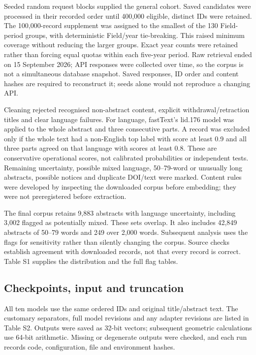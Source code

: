 \documentclass[12pt]{article}
\begin{document}
Seeded random request blocks supplied the general cohort. Saved candidates were processed in their recorded order until 400,000 eligible, distinct IDs were retained. The 100,000-record supplement was assigned to the smallest of the 130 Field-period groups, with deterministic Field/year tie-breaking. This raised minimum coverage without reducing the larger groups. Exact year counts were retained rather than forcing equal quotas within each five-year period. Raw retrieval ended on 15 September 2026; API responses were collected over time, so the corpus is not a simultaneous database snapshot. Saved responses, ID order and content hashes are required to reconstruct it; seeds alone would not reproduce a changing API.

Cleaning rejected recognised non-abstract content, explicit withdrawal/retraction titles and clear language failures. For language, fastText's lid.176 model was applied to the whole abstract and three consecutive parts. A record was excluded only if the whole text had a non-English top label with score at least 0.9 and all three parts agreed on that language with scores at least 0.8. These are conservative operational scores, not calibrated probabilities or independent tests. Remaining uncertainty, possible mixed language, 50--79-word or unusually long abstracts, possible notices and duplicate DOI/text were marked. Content rules were developed by inspecting the downloaded corpus before embedding; they were not preregistered before extraction.

The final corpus retains 9,883 abstracts with language uncertainty, including 3,002 flagged as potentially mixed. These sets overlap. It also includes 42,849 abstracts of 50--79 words and 249 over 2,000 words. Subsequent analysis uses the flags for sensitivity rather than silently changing the corpus. Source checks establish agreement with downloaded records, not that every record is correct. Table S1 supplies the distribution and the full flag tables.
\clearpage

\FloatBarrier
\subsection{Checkpoints, input and truncation}
All ten models use the same ordered IDs and original title/abstract text. The customary separators, full model revisions and any adapter revisions are listed in Table S2. Outputs were saved as 32-bit vectors; subsequent geometric calculations use 64-bit arithmetic. Missing or degenerate outputs were checked, and each run records code, configuration, file and environment hashes.
\end{document}
